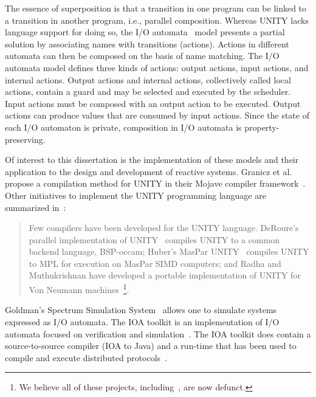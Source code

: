 The essence of superposition is that a transition in one program can be linked to a transition in another program, i.e., parallel composition.
Whereas UNITY lacks language support for doing so, the I/O automata~\cite{nancy1996distributed} model presents a partial solution by associating names with transitions (actions).
Actions in different automata can then be composed on the basis of name matching.
The I/O automata model defines three kinds of actions:  output actions, input actions, and internal actions.
Output actions and internal actions, collectively called local actions, contain a guard and may be selected and executed by the scheduler.
Input actions must be composed with an output action to be executed.
Output actions can produce values that are consumed by input actions.
Since the state of each I/O automaton is private, composition in I/O automata is property-preserving.

Of interest to this dissertation is the implementation of these models and their application to the design and development of reactive systems.
Granicz et al. propose a compilation method for UNITY in their Mojave compiler framework~\cite{GZH03}.
Other initiatives to implement the UNITY programming language are summarized in~\cite{GZH03}:
\begin{quotation}
Few compilers have been developed for the UNITY language.
DeRoure's parallel implementation of UNITY~\cite{deroure1991parallel} compiles UNITY to a common backend language, BSP-occam; Huber's MasPar UNITY~\cite{huber1992maspar} compiles UNITY to MPL for execution on MasPar SIMD computers; and Radha and Muthukrishnan have developed a portable implementation of UNITY for Von Neumann machines~\cite{radha1993portable}\footnote{We believe all of these projects, including~\cite{GZH03}, are now defunct.}.
\end{quotation}
Goldman's Spectrum Simulation System~\cite{goldman1990distributed} allows one to simulate systems expressed as I/O automata.
The IOA toolkit is an implementation of I/O automata focused on verification and simulation~\cite{ioatoolkit}.
The IOA toolkit does contain a source-to-source compiler (IOA to Java) and a run-time that has been used to compile and execute distributed protocols~\cite{georgiou2009automated}.

